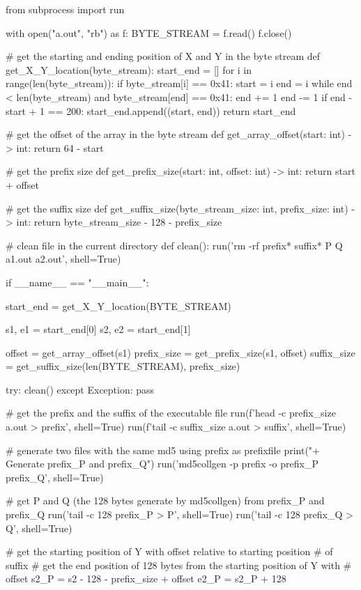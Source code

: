 \documentclass{article}
\begin{document}
\begin{python}
from subprocess import run

with open("a.out", "rb") as f:
    BYTE_STREAM = f.read()
f.close()


# get the starting and ending position of X and Y in the byte stream
def get_X_Y_location(byte_stream):
    start_end = []
    for i in range(len(byte_stream)):
        if byte_stream[i] == 0x41:
            start = i
            end = i
            while end < len(byte_stream) and byte_stream[end] == 0x41:
                end += 1
            end -= 1
            if end - start + 1 == 200:
                start_end.append((start, end))
    return start_end


# get the offset of the array in the byte stream
def get_array_offset(start: int) -> int:
    return 64 - start %


# get the prefix size
def get_prefix_size(start: int, offset: int) -> int:
    return start + offset


# get the suffix size
def get_suffix_size(byte_stream_size: int, prefix_size: int) -> int:
    return byte_stream_size - 128 - prefix_size


# clean file in the current directory
def clean():
    run('rm -rf prefix* suffix* P Q a1.out a2.out', shell=True)


if __name__ == "__main__":

    start_end = get_X_Y_location(BYTE_STREAM)

    s1, e1 = start_end[0]
    s2, e2 = start_end[1]

    offset = get_array_offset(s1)
    prefix_size = get_prefix_size(s1, offset)
    suffix_size = get_suffix_size(len(BYTE_STREAM), prefix_size)

    try:
        clean()
    except Exception:
        pass

    # get the prefix and the suffix of the executable file
    run(f'head -c {prefix_size} a.out > prefix', shell=True)
    run(f'tail -c {suffix_size} a.out > suffix', shell=True)

    # generate two files with the same md5 using prefix as prefixfile
    print("\n+ Generate prefix_P and prefix_Q")
    run('md5collgen -p prefix -o prefix_P prefix_Q', shell=True)

    # get P and Q (the 128 bytes generate by md5collgen) from prefix_P and prefix_Q
    run('tail -c 128 prefix_P > P', shell=True)
    run('tail -c 128 prefix_Q > Q', shell=True)

    # get the starting position of Y with offset relative to starting position
    # of suffix
    # get the end position of 128 bytes from the starting position of Y with
    # offset
    s2_P = s2 - 128 - prefix_size + offset
    e2_P = s2_P + 128


\end{python}
\end{document}
